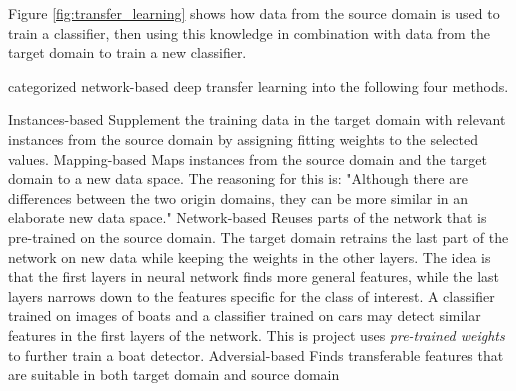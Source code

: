 Figure \ref{fig:transfer_learning} shows how data from the source domain is used to train a classifier, then using this knowledge in combination with data from the target domain to train a new classifier. 

\vspace{3mm}

\citep{TransferLearning2} categorized network-based deep transfer learning into the following four methods.

\begin{outline}
    \1 Instances-based
       \2 Supplement the training data in the target domain with relevant instances from the source domain by assigning fitting weights to the selected values.
    \1 Mapping-based
       \2 Maps instances from the source domain and the target domain to a new data space. The reasoning for this is: "Although there are differences between the two origin domains, they can be more similar in an elaborate new data space." \citep{TransferLearning2}
    \1 Network-based
       \2 Reuses parts of the network that is pre-trained on the source domain. The target domain retrains the last part of the network on new data while keeping the weights in the other layers. The idea is that the first layers in neural network finds more general features, while the last layers narrows down to the features specific for the class of interest. A classifier trained on images of boats and a classifier trained on cars may detect similar features in the first layers of the network. This is project uses \textit{pre-trained weights} to further train a boat detector.
    \1 Adversial-based
       \2 Finds transferable features that are suitable in both target domain and source domain
\end{outline}



\cleardoublepage